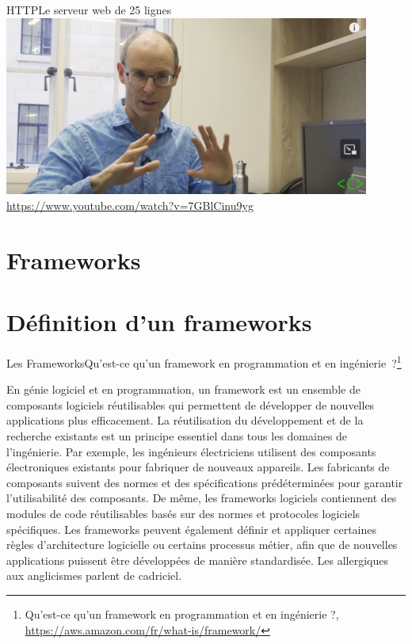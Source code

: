 \documentclass{beamer}
\begin{document}
    \begin{frame}{HTTP}{Le serveur web de 25 lignes}
        \centering
        \includegraphics[width=12cm]{image/25-lines-server} \\ \url{https://www.youtube.com/watch?v=7GBlCinu9yg} \\
    \end{frame}


    \section{Frameworks}\label{sec:framewoks}


    \section{Définition d'un frameworks}\label{subsec:framewok-definition}

    \begin{frame}{Les Frameworks}{Qu'est-ce qu'un framework en programmation et en ingénierie~?\footnote{Qu'est-ce qu'un framework en programmation et en ingénierie ?, \url{https://aws.amazon.com/fr/what-is/framework/}}}
        \begin{small}
            En génie logiciel et en programmation, un framework est un ensemble de composants logiciels réutilisables qui permettent de développer de nouvelles applications plus efficacement.
            La réutilisation du développement et de la recherche existants est un principe essentiel dans tous les domaines de l'ingénierie.
            Par exemple, les ingénieurs électriciens utilisent des composants électroniques existants pour fabriquer de nouveaux appareils.
            Les fabricants de composants suivent des normes et des spécifications prédéterminées pour garantir l'utilisabilité des composants.
            \bigbreak
            De même, les frameworks logiciels contiennent des modules de code réutilisables basés sur des normes et protocoles logiciels spécifiques.
            Les frameworks peuvent également définir et appliquer certaines règles d'architecture logicielle ou certains processus métier, afin que de nouvelles applications puissent être développées de manière standardisée.
            \bigbreak
            Les allergiques aux anglicismes parlent de cadriciel.
        \end{small}
    \end{frame}
\end{document}
